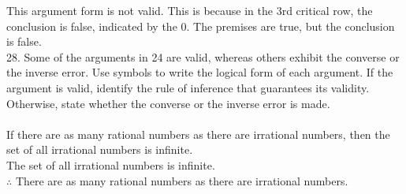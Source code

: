 \documentclass{article}
\begin{document}
This argument form is not valid. This is because in the 3rd critical row, the conclusion is false, indicated by the 0. The premises are true, but the conclusion is false. \\
28. Some of the arguments in 24 are valid, whereas others exhibit the converse or the inverse error. Use symbols to write
the logical form of each argument. If the argument is valid, identify the rule of inference that guarantees its validity. Otherwise,
state whether the converse or the inverse error is made. \\
\\
If there are as many rational numbers as there are irrational numbers, then the set of all irrational numbers is infinite. \\
The set of all irrational numbers is infinite. \\
$\therefore$ There are as many rational numbers as there are irrational
numbers.\\
\end{document}
